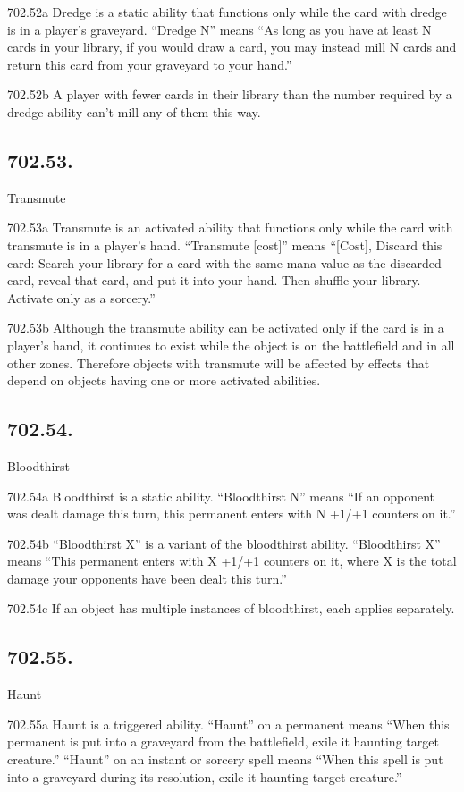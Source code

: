 702.52a Dredge is a static ability that functions only while the card with dredge is in a player’s graveyard. “Dredge N” means “As long as you have at least N cards in your library, if you would draw a card, you may instead mill N cards and return this card from your graveyard to your hand.”

702.52b A player with fewer cards in their library than the number required by a dredge ability can’t mill any of them this way.

\subsection*{702.53.}
Transmute

702.53a Transmute is an activated ability that functions only while the card with transmute is in a player’s hand. “Transmute [cost]” means “[Cost], Discard this card: Search your library for a card with the same mana value as the discarded card, reveal that card, and put it into your hand. Then shuffle your library. Activate only as a sorcery.”

702.53b Although the transmute ability can be activated only if the card is in a player’s hand, it continues to exist while the object is on the battlefield and in all other zones. Therefore objects with transmute will be affected by effects that depend on objects having one or more activated abilities.

\subsection*{702.54.}
Bloodthirst

702.54a Bloodthirst is a static ability. “Bloodthirst N” means “If an opponent was dealt damage this turn, this permanent enters with N +1/+1 counters on it.”

702.54b “Bloodthirst X” is a variant of the bloodthirst ability. “Bloodthirst X” means “This permanent enters with X +1/+1 counters on it, where X is the total damage your opponents have been dealt this turn.”

702.54c If an object has multiple instances of bloodthirst, each applies separately.

\subsection*{702.55.}
Haunt

702.55a Haunt is a triggered ability. “Haunt” on a permanent means “When this permanent is put into a graveyard from the battlefield, exile it haunting target creature.” “Haunt” on an instant or sorcery spell means “When this spell is put into a graveyard during its resolution, exile it haunting target creature.”

